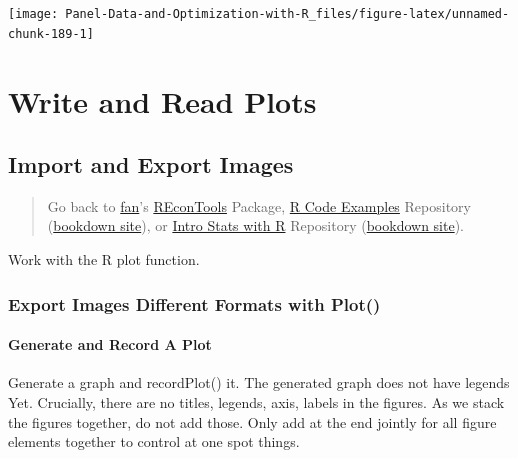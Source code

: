\documentclass[
]{book}
\begin{document}
\begin{center}\texttt{[image: Panel-Data-and-Optimization-with-R\_files/figure-latex/unnamed-chunk-189-1]} \end{center}

\hypertarget{write-and-read-plots}{%
\section{Write and Read Plots}\label{write-and-read-plots}}

\hypertarget{import-and-export-images}{%
\subsection{Import and Export Images}\label{import-and-export-images}}

\begin{quote}
Go back to \href{http://fanwangecon.github.io/}{fan}'s \href{https://fanwangecon.github.io/REconTools/}{REconTools} Package, \href{https://fanwangecon.github.io/R4Econ/}{R Code Examples} Repository (\href{https://fanwangecon.github.io/R4Econ/bookdown}{bookdown site}), or \href{https://fanwangecon.github.io/Stat4Econ/}{Intro Stats with R} Repository (\href{https://fanwangecon.github.io/Stat4Econ/bookdown}{bookdown site}).
\end{quote}

Work with the R plot function.

\hypertarget{export-images-different-formats-with-plot}{%
\subsubsection{Export Images Different Formats with Plot()}\label{export-images-different-formats-with-plot}}

\hypertarget{generate-and-record-a-plot}{%
\paragraph{Generate and Record A Plot}\label{generate-and-record-a-plot}}

Generate a graph and recordPlot() it. The generated graph does not have legends Yet. Crucially, there are no titles, legends, axis, labels in the figures. As we stack the figures together, do not add those. Only add at the end jointly for all figure elements together to control at one spot things.
\end{document}
